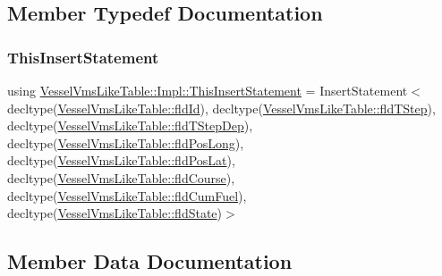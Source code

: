 \subsection{Member Typedef Documentation}
\mbox{\label{struct_vessel_vms_like_table_1_1_impl_aef1b507be7f680a656e5604c3049a99a}} 
\subsubsection{\texorpdfstring{ThisInsertStatement}{ThisInsertStatement}}
{\footnotesize\ttfamily using \mbox{\hyperlink{struct_vessel_vms_like_table_1_1_impl_aef1b507be7f680a656e5604c3049a99a}{Vessel\+Vms\+Like\+Table\+::\+Impl\+::\+This\+Insert\+Statement}} =  Insert\+Statement$<$ decltype(\mbox{\hyperlink{class_vessel_vms_like_table_a87f903e5516aaccb43c1ea6e90c0a923}{Vessel\+Vms\+Like\+Table\+::fld\+Id}}), decltype(\mbox{\hyperlink{class_vessel_vms_like_table_a5e10f870c3b87126c01b1b953dea9876}{Vessel\+Vms\+Like\+Table\+::fld\+T\+Step}}), decltype(\mbox{\hyperlink{class_vessel_vms_like_table_a3d33393b14a942cca454354db1aa73a3}{Vessel\+Vms\+Like\+Table\+::fld\+T\+Step\+Dep}}), decltype(\mbox{\hyperlink{class_vessel_vms_like_table_a07f5fde6d95b76f05b95fa9f462a69d5}{Vessel\+Vms\+Like\+Table\+::fld\+Pos\+Long}}), decltype(\mbox{\hyperlink{class_vessel_vms_like_table_a115196d529d843c8f9d09cb46273ee49}{Vessel\+Vms\+Like\+Table\+::fld\+Pos\+Lat}}), decltype(\mbox{\hyperlink{class_vessel_vms_like_table_aa235f51c2df9c69e96b327193a28dfb3}{Vessel\+Vms\+Like\+Table\+::fld\+Course}}), decltype(\mbox{\hyperlink{class_vessel_vms_like_table_ad06a099f3e8d2fec045bcd990fb81650}{Vessel\+Vms\+Like\+Table\+::fld\+Cum\+Fuel}}), decltype(\mbox{\hyperlink{class_vessel_vms_like_table_a2cbcedc208e696f8f73f41bd376e420b}{Vessel\+Vms\+Like\+Table\+::fld\+State}})$>$}



\subsection{Member Data Documentation}
\mbox{\label{struct_vessel_vms_like_table_1_1_impl_ae0cd8c366047ff5b5a085bb5b781acf7}} 
